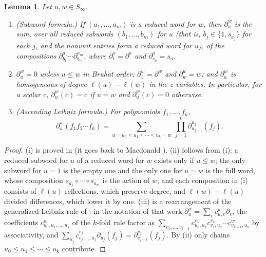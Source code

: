 \documentclass{amsart}
\newtheorem{lemma}{Lemma}[section]
\theoremstyle{definition}
\theoremstyle{remark}
\numberwithin{equation}{section}
\begin{document}
\begin{lemma} \label{lemma:skewfacts}
Let $u,w\in S_\infty$.
\begin{enumerate}
\item[(i)] (Subword formula.) If $(a_1,\ldots,a_m)$ is a reduced word for $w$, then $\partial^w_u$ is the sum, over all reduced subwords $(b_1,\ldots,b_m)$ for $u$ (that is, $b_j\in\{1,s_{a_j}\}$ for each $j$, and the nonunit entries form a reduced word for $u$), of the compositions $\partial^{a_1}_{b_1}\cdots\partial^{a_m}_{b_m}$, where $\partial^{a}_{1}=\partial^a$ and $\partial^{a}_{s_a}=s_a$.
\item[(ii)] $\partial^w_u=0$ unless $u\leq w$ in Bruhat order; $\partial^w_1=\partial^w$ and $\partial^w_w=w$; and $\partial^w_u$ is homogeneous of degree $\ell(u)-\ell(w)$ in the $z$-variables. In particular, for a scalar $c$, $\partial^w_u(c)=c$ if $u=w$ and $\partial^w_u(c)=0$ otherwise.
\item[(iii)] (Ascending Leibniz formula.) For polynomials $f_1,\ldots,f_k$,
$$\partial^w_u(f_1f_2\cdots f_k)=\sum_{u=u_0\leq u_1\leq\cdots\leq u_k=w}\ \prod_{j=1}^k\partial^{u_j}_{u_{j-1}}(f_j).$$
\end{enumerate}
\end{lemma}
\begin{proof}
(i) is proved in \cite{samuelmolev} (it goes back to Macdonald \cite{notes}). (ii) follows from (i): a reduced subword for $u$ of a reduced word for $w$ exists only if $u\leq w$; the only subword for $u=1$ is the empty one and the only one for $u=w$ is the full word, whose composition $s_{a_1}\circ\cdots\circ s_{a_m}$ is the action of $w$; and each composition in (i) consists of $\ell(u)$ reflections, which preserve degree, and $\ell(w)-\ell(u)$ divided differences, which lower it by one. (iii) is a rearrangement of the generalized Leibniz rule of \cite[Corollary~3.5.4]{samuelleibniz}: in the notation of that work $\partial^w_u=\sum_vc^w_{u,v}\partial_v$, the coefficients $c^w_{u_0,u_1,\ldots,u_k}$ of the $k$-fold rule factor as $\sum_{v_1,\ldots,v_{k-1}}c^{v_1}_{u_0,u_1}c^{v_2}_{v_1,u_2}\cdots c^{w}_{v_{k-1},u_k}$ by associativity, and $\sum_{u_j}c^{v_j}_{v_{j-1},u_j}\partial_{u_j}(f_j)=\partial^{v_j}_{v_{j-1}}(f_j)$. By (ii) only chains $u_0\leq u_1\leq\cdots\leq u_k$ contribute.
\end{proof}
\end{document}
